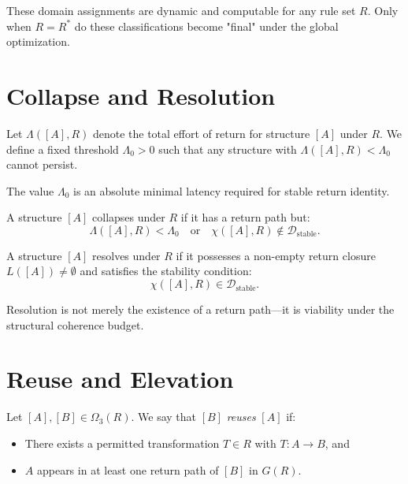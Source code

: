 \noindent
These domain assignments are dynamic and computable for any rule set $R$. Only when $R = R^*$ do these classifications become "final" under the global optimization.

\section{Collapse and Resolution}

\begin{definition}
Let $\Lambda([A], R)$ denote the total effort of return for structure $[A]$ under $R$. We define a fixed threshold $\Lambda_0 > 0$ such that any structure with $\Lambda([A], R) < \Lambda_0$ cannot persist.

The value $\Lambda_0$ is an absolute minimal latency required for stable return identity.
\end{definition}

\begin{definition}[Collapse]
A structure $[A]$ collapses under $R$ if it has a return path but:
\[
\Lambda([A], R) < \Lambda_0 \quad \text{or} \quad \chi([A], R) \notin \mathcal{D}_{\text{stable}}.
\]
\end{definition}

\begin{definition}[Resolution]
A structure $[A]$ resolves under $R$ if it possesses a non-empty return closure $L([A]) \ne \emptyset$ and satisfies the stability condition:
\[
\chi([A], R) \in \mathcal{D}_{\text{stable}}.
\]
\end{definition}

\noindent
Resolution is not merely the existence of a return path—it is viability under the structural coherence budget.

\section{Reuse and Elevation}

\begin{definition}[Reuse]
Let $[A], [B] \in \Omega_3(R)$. We say that $[B]$ \emph{reuses} $[A]$ if:
\begin{itemize}
    \item There exists a permitted transformation $T \in R$ with $T: A \to B$, and
    \item $A$ appears in at least one return path of $[B]$ in $G(R)$.
\end{itemize}
\end{definition}

